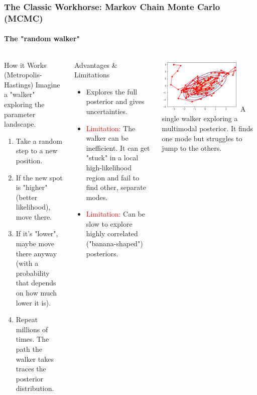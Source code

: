 \documentclass[aspectratio=169]{beamer}
\begin{document}
\begin{frame}
    \frametitle{The Classic Workhorse: Markov Chain Monte Carlo (MCMC)}
    \framesubtitle{The "random walker"}
    
    \begin{columns}[T]
        \begin{block}{How it Works (Metropolis-Hastings)}
            Imagine a "walker" exploring the parameter landscape.
            \begin{enumerate}
                \item Take a random step to a new position.
                \item If the new spot is "higher" (better likelihood), move there.
                \item If it's "lower", maybe move there anyway (with a probability that depends on how much lower it is).
                \item Repeat millions of times. The path the walker takes traces the posterior distribution.
            \end{enumerate}
        \end{block}
        
        \begin{block}{Advantages \& Limitations}
            \begin{itemize}
                \item Explores the full posterior and gives uncertainties.
                \item \textcolor{red}{Limitation:} The walker can be inefficient. It can get "stuck" in a local high-likelihood region and fail to find other, separate modes.
                \item \textcolor{red}{Limitation:} Can be slow to explore highly correlated ("banana-shaped") posteriors.
            \end{itemize}
        \end{block}
        
        \begin{center}
            \includegraphics[width=0.8\textwidth]{figures/metropolis-hastings.png} %
            \small A single walker exploring a multimodal posterior. It finds one mode but struggles to jump to the others.
        \end{center}
    \end{columns}
    

\end{frame}
\end{document}
